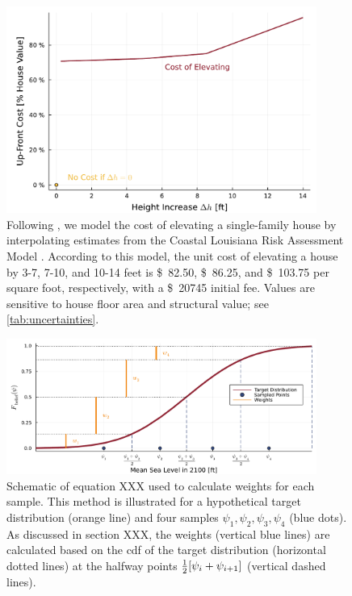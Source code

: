 \documentclass[12pt]{article}
\newcommand{\usd}[1]{\SI{#1}[\$]{}}
\begin{document}
\begin{figure}
    \centering
    \includegraphics[width=4in]{cost-up-front}
    \caption{
        Following \citet{zarekarizi_suboptimal:2020}, we model the cost of elevating a single-family house by interpolating estimates from the Coastal Louisiana Risk Assessment Model \citep{johnson_clara:2013}.
        According to this model, the unit cost of elevating a house by 3-7, 7-10, and 10-14 feet is \usd{82.50}, \usd{86.25}, and \usd{103.75} per square foot, respectively, with a \usd{20745} initial fee.
        Values are sensitive to house floor area and structural value; see \cref{tab:uncertainties}.
    }\label{fig:cost-up-front}
\end{figure}

\begin{figure}
    \centering
    \includegraphics[width=4in]{grid-sketch}
    \caption{
        Schematic of equation XXX used to calculate weights for each sample. %
        This method is illustrated for a hypothetical target distribution (orange line) and four samples $\psi_1, \psi_2, \psi_3, \psi_4$ (blue dots).
        As discussed in section XXX, the weights (vertical blue lines) are calculated based on the \gls{cdf} of the target distribution  (horizontal dotted lines) at the halfway points $\frac{1}{2}\qty[\psi_i+\psi_{i+1}]$ (vertical dashed lines). %
    }\label{fig:grid-sketch}
\end{figure}
\end{document}
